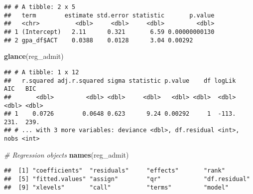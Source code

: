 \documentclass[
]{article}
\newenvironment{Shaded}{\begin{snugshade}}{\end{snugshade}}
\newcommand{\CommentTok}[1]{\textcolor[rgb]{0.56,0.35,0.01}{\textit{#1}}}
\newcommand{\KeywordTok}[1]{\textcolor[rgb]{0.13,0.29,0.53}{\textbf{#1}}}
\newcommand{\NormalTok}[1]{#1}
\newcommand{\OperatorTok}[1]{\textcolor[rgb]{0.81,0.36,0.00}{\textbf{#1}}}
\begin{document}
\begin{verbatim}
## # A tibble: 2 x 5
##   term        estimate std.error statistic       p.value
##   <chr>          <dbl>     <dbl>     <dbl>         <dbl>
## 1 (Intercept)   2.11      0.321       6.59 0.00000000130
## 2 gpa_df$ACT    0.0388    0.0128      3.04 0.00292
\end{verbatim}

\begin{Shaded}
\begin{Highlighting}[]
\KeywordTok{glance}\NormalTok{(reg_admit)}
\end{Highlighting}
\end{Shaded}

\begin{verbatim}
## # A tibble: 1 x 12
##   r.squared adj.r.squared sigma statistic p.value    df logLik   AIC   BIC
##       <dbl>         <dbl> <dbl>     <dbl>   <dbl> <dbl>  <dbl> <dbl> <dbl>
## 1    0.0726        0.0648 0.623      9.24 0.00292     1  -113.  231.  239.
## # ... with 3 more variables: deviance <dbl>, df.residual <int>, nobs <int>
\end{verbatim}

\begin{Shaded}
\begin{Highlighting}[]
\CommentTok{# Regression objects}
\KeywordTok{names}\NormalTok{(reg_admit)}
\end{Highlighting}
\end{Shaded}

\begin{verbatim}
##  [1] "coefficients"  "residuals"     "effects"       "rank"         
##  [5] "fitted.values" "assign"        "qr"            "df.residual"  
##  [9] "xlevels"       "call"          "terms"         "model"
\end{verbatim}

\begin{Shaded}
\end{Shaded}
\end{document}
